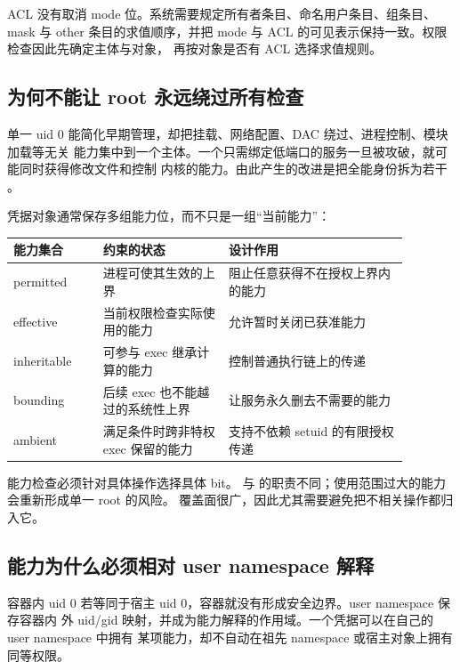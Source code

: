 ACL 没有取消 mode 位。系统需要规定所有者条目、命名用户条目、组条目、mask 与 other
条目的求值顺序，并把 mode 与 ACL 的可见表示保持一致。权限检查因此先确定主体与对象，
再按对象是否有 ACL 选择求值规则。

\subsection{为何不能让 root 永远绕过所有检查}

单一 uid 0 能简化早期管理，却把挂载、网络配置、DAC 绕过、进程控制、模块加载等无关
能力集中到一个主体。一个只需绑定低端口的服务一旦被攻破，就可能同时获得修改文件和控制
内核的能力。由此产生的改进是把全能身份拆为若干
。

凭据对象通常保存多组能力位，而不只是一组“当前能力”：

\begin{longtable}{|L{0.20\linewidth}|L{0.28\linewidth}|L{0.40\linewidth}|}
\hline
能力集合 & 约束的状态 & 设计作用 \\ \hline
permitted & 进程可使其生效的上界 & 阻止任意获得不在授权上界内的能力 \\ \hline
effective & 当前权限检查实际使用的能力 & 允许暂时关闭已获准能力 \\ \hline
inheritable & 可参与 exec 继承计算的能力 & 控制普通执行链上的传递 \\ \hline
bounding & 后续 exec 也不能越过的系统性上界 & 让服务永久删去不需要的能力 \\ \hline
ambient & 满足条件时跨非特权 exec 保留的能力 & 支持不依赖 setuid 的有限授权传递 \\ \hline
\end{longtable}

能力检查必须针对具体操作选择具体 bit。 与
 的职责不同；使用范围过大的能力会重新形成单一 root 的风险。
 覆盖面很广，因此尤其需要避免把不相关操作都归入它。

\subsection{能力为什么必须相对 user namespace 解释}

容器内 uid 0 若等同于宿主 uid 0，容器就没有形成安全边界。user namespace 保存容器内
外 uid/gid 映射，并成为能力解释的作用域。一个凭据可以在自己的 user namespace 中拥有
某项能力，却不自动在祖先 namespace 或宿主对象上拥有同等权限。

